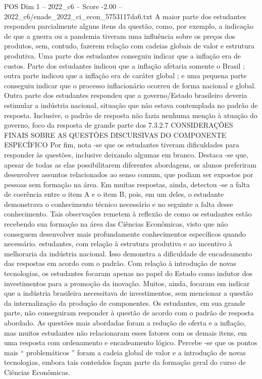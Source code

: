 \begin{textsample}{POS Dim 1 – 2022\_c6 – Score -2.00 – 2022\_c6/enade\_2022\_ci\_econ\_5753117da6.txt}
A maior parte dos estudantes respondeu parcialmente alguns itens da questão, como, por exemplo, a indicação de que a guerra ou a pandemia tiveram uma influência sobre os preços dos produtos, sem, contudo, fazerem relação com cadeias globais de valor e estrutura produtiva.
Uma parte dos estudantes conseguiu indicar que a inflação era de custos.
Parte dos estudantes indicou que a inflação afetaria somente o Brasil ; outra parte indicou que a inflação era de caráter global ; e uma pequena parte conseguiu indicar que o processo inflacionário ocorreu de forma nacional e global.
Outra parte dos estudantes respondeu que a governo/Estado brasileiro deveria estimular a indústria nacional, situação que não estava contemplada no padrão de resposta.
Inclusive, o padrão de resposta não fazia nenhuma menção à atuação do governo, foco da resposta de grande parte dos 7.3.2.7 CONSIDERAÇÕES FINAIS SOBRE AS QUESTÕES DISCURSIVAS DO COMPONENTE ESPECÍFICO Por fim, nota -se que os estudantes tiveram dificuldades para responder às questões, inclusive deixando algumas em branco.
Destaca -se que, apesar de todas as elas possibilitarem diferentes abordagens, os alunos preferiram desenvolver assuntos relacionados ao senso comum, que podiam ser expostos por pessoas sem formação na área.
Em muitas respostas, ainda, detectou -se a falta de coerência entre o item A e o item B, pois, em um deles, o estudante demonstrava o conhecimento técnico necessário e no seguinte a falta desse conhecimento.
Tais observações remetem à reflexão de como os estudantes estão recebendo sua formação na área das Ciências Econômicas, visto que não conseguem desenvolver mais profundamente conhecimentos específicos quando necessário. estudantes, com relação à estrutura produtiva e ao incentivo à melhoraria da indústria nacional.
Isso demonstra a dificuldade de encadeamento das respostas em acordo com o padrão.
Com relação à introdução de novas tecnologias, os estudantes focaram apenas no papel do Estado como indutor dos investimentos para a promoção da inovação.
Muitos, ainda, focaram em indicar que a indústria brasileira necessitava de investimentos, sem mencionar a questão da internalização da produção de componentes.
Os estudantes, em sua grande parte, não conseguiram responder à questão de acordo com o padrão de resposta abordado.
As questões mais abordadas foram a redução de oferta e a inflação, mas muitos estudantes não relacionaram esses fatores com os demais itens, em uma resposta com ordenamento e encadeamento lógico.
Percebe -se que os pontos mais “ problemáticos ” foram a cadeia global de valor e a introdução de novas tecnologias, embora tais conteúdos façam parte da formação geral do curso de Ciências Econômicas.

\end{textsample}
